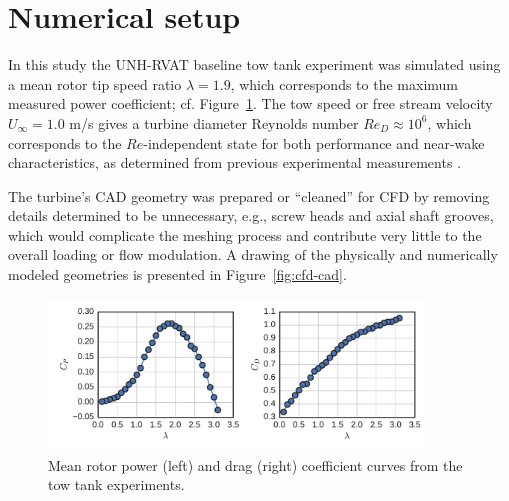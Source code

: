 \documentclass[aip,graphicx]{revtex4-1}
\begin{document}
\section{Numerical setup}

In this study the UNH-RVAT baseline tow tank experiment was simulated using a
mean rotor tip speed ratio $\lambda=1.9$, which corresponds to the maximum
measured power coefficient; cf. Figure~\ref{fig:exp-perf}. The tow speed or free
stream velocity $U_\infty=1.0$ m/s gives a turbine diameter Reynolds number
$Re_D \approx 10^6$, which corresponds to the $Re$-independent state for both
performance and near-wake characteristics, as determined from previous
experimental measurements \cite{Bachant2014, Bachant2016-Energies}.

The turbine's CAD geometry was prepared or ``cleaned'' for CFD by removing
details determined to be unnecessary, e.g., screw heads and axial shaft grooves,
which would complicate the meshing process and contribute very little to the
overall loading or flow modulation. A drawing of the physically and numerically
modeled geometries is presented in Figure~\ref{fig:cfd-cad}.

\begin{figure}
    \centering

    \includegraphics[width=0.9\textwidth]{figures/exp_perf}

    \caption{Mean rotor power (left) and drag (right) coefficient curves from
        the tow tank experiments\cite{Bachant2016-RVAT-Re-dep}.}

    \label{fig:exp-perf}
\end{figure}
\end{document}
